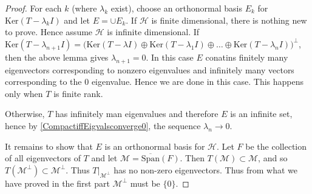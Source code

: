 \begin{proof}
  For each $k$ (where $\lambda_k$ exist), choose an orthonormal basis
  $E_k$ for $\textrm{Ker}(T - \lambda_k I)$ and let $E = \cup E_k$.
  If $\mathcal{H}$ is finite dimensional, there is nothing new to
  prove. Hence assume $\mathcal{H}$ is infinite dimensional. If
  $\textrm{Ker}(T - \lambda_{n+1}I) = \big(\textrm{Ker}(T - \lambda
    I) \oplus \textrm{Ker}(T - \lambda_1 I ) \oplus \ldots \oplus
  \textrm{Ker}(T - \lambda_{n} I) \big)^\perp$, then the above lemma
  gives $\lambda_{n+1} = 0$. In this case $E$ conatins finitely many
  eigenvectors corresponding to nonzero eigenvalues and infinitely
  many vectors corresponding to the $0$ eigenvalue. Hence we are done
  in this case. This happens only when $T$ is finite rank.

  Otherwise, $T$ has infinitely man eigenvalues and therefore $E$ is
  an infinite set, hence by \autoref{CompactiffEigvalsconverge0},  the sequence
  $\lambda_n \to 0$.

  It remains to show that $E$ is an orthonormal basis for
  $\mathcal{H}$. Let $F$ be the collection of all eigenvectors of $T$
  and let $\mathcal{M} = \overline{ \textrm{Span}}(F)$.
  Then $T(\mathcal{M}) \subset \mathcal{M}$, and so
  $T(\mathcal{M}^\perp) \subset \mathcal{M}^\perp$. Thus
  $T|_{\mathcal{ M}^\perp}$ has no non-zero eigenvectors. Thus from
  what we have proved in the first part $\mathcal{M}^\perp$ must be $\{ 0 \}$.
\end{proof}

